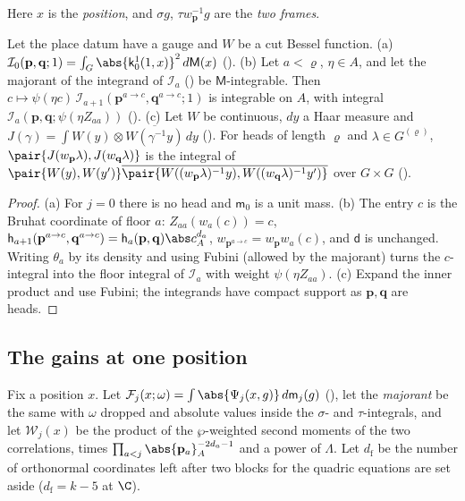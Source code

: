 Here $x$ is the \emph{position}, and $\sigma g$, $\tau w_{\mathbf p}^{-1}g$ are the \emph{two frames}.

\begin{proposition}\label{sp-frames:prop:forms}
Let the place datum have a gauge and $W$ be a cut Bessel function. (a) $\mathcal I_0(\mathbf p,\mathbf q;1)=\int_G\abs{\mathsf k^1_0(1,x)}^2\,d\mathsf M(x)$
(). (b) Let $a<\varrho$, $\eta\in A$, and let
the majorant of the integrand of $\mathcal I_a$ () be
$\mathsf M$-integrable. Then $c\mapsto\psi(\eta c)\,\mathcal I_{a+1}(\mathbf p^{a\to c},\mathbf q^{a\to c};1)$ is
integrable on $A$, with integral $\mathcal I_a(\mathbf p,\mathbf q;\psi(\eta Z_{aa}))$
(). (c) Let $W$ be continuous, $dy$ a Haar
measure and $J(\gamma)=\int W(y)\otimes\overline{W(\gamma^{-1}y)}\,dy$ ().
For heads of length $\varrho$ and $\lambda\in G^{(\varrho)}$, $\pair{J(w_{\mathbf p}\lambda),J(w_{\mathbf q}\lambda)}$ is the integral of
$\pair{W(y),W(y')}\overline{\pair{W((w_{\mathbf p}\lambda)^{-1}y),W((w_{\mathbf q}\lambda)^{-1}y')}}$ over $G\times G$
().
\end{proposition}

\begin{proof}
(a) For $j=0$ there is no head and $\mathsf m_0$ is a unit mass. (b) The entry $c$ is the Bruhat
coordinate of floor $a$: $Z_{aa}(w_a(c))=c$, $\mathsf h_{a+1}(\mathbf p^{a\to c},\mathbf q^{a\to c})=\mathsf h_a(\mathbf p,\mathbf q)\abs
c_A^{d_a}$, $w_{\mathbf p^{a\to c}}=w_{\mathbf p}w_a(c)$, and $\mathsf d$ is unchanged. Writing $\theta_a$ by its density and
using Fubini (allowed by the majorant) turns the $c$-integral into the floor integral of
$\mathcal I_a$ with weight $\psi(\eta Z_{aa})$. (c) Expand the inner product and use Fubini; the
integrands have compact support as $\mathbf p,\mathbf q$ are heads.
\end{proof}

\subsection{The gains at one position}\label{sp-frames:ss:gains}

Fix a position $x$. Let $\mathcal F_j(x;\omega)=\int\abs{\Psi_j(x,g)}\,d\mathsf m_j(g)$
(), let the \emph{majorant} be the same with $\omega$
dropped and absolute values inside the $\sigma$- and $\tau$-integrals, and let $\mathcal W_j(x)$ be the product of the $\wp$-weighted second moments of the two correlations, times
$\prod_{a<j}\abs{\mathbf p_a}_A^{-2d_a-1}$ and a power of $\Lambda$. Let $d_{\mathrm f}$ be the number of
orthonormal coordinates left after two blocks for the quadric equations are set aside
($d_{\mathrm f}=k-5$ at $\C$).

